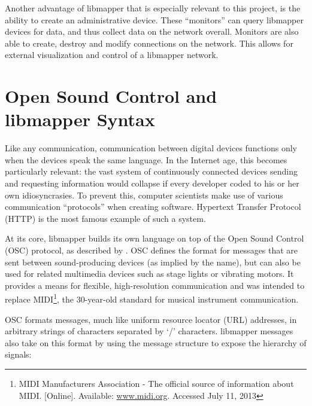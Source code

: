 Another advantage of libmapper that is especially relevant to this project, is the ability to create an administrative device. These ``monitors'' can query libmapper devices for data, and thus collect data on the network overall. Monitors are also able to create, destroy and modify connections on the network. This allows for external visualization and control of a libmapper network.

	\section{Open Sound Control and libmapper Syntax} %
	\label{sec:open_sound_control_and_libmapper_syntax}


Like any communication, communication between digital devices functions only when the devices speak the same language. In the Internet age, this becomes particularly relevant: the vast system of continuously connected devices sending and requesting information would collapse if every developer coded to his or her own idiosyncrasies. To prevent this, computer scientists make use of various communication ``protocols'' when creating software. Hypertext Transfer Protocol (HTTP) is the most famous example of such a system.

At its core, libmapper builds its own language on top of the Open Sound Control (OSC) protocol, as described by . OSC defines the format for messages that are sent between sound-producing devices (as implied by the name), but can also be used for related multimedia devices such as stage lights or vibrating motors. It provides a means for flexible, high-resolution communication and was intended to replace MIDI\footnote{MIDI Manufacturers Association - The official source of information about MIDI. [Online]. Available: \url{www.midi.org}. Accessed July 11, 2013}, the 30-year-old standard for musical instrument communication. 

OSC formats messages, much like uniform resource locator (URL) addresses, in arbitrary strings of characters separated by `/' characters. libmapper messages also take on this format by using the message structure to expose the hierarchy of signals:

